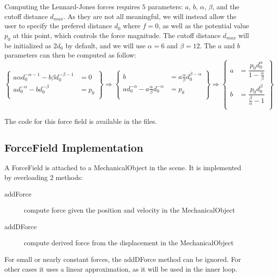 Computing the Lennard-Jones forces requires $5$ parameters: $a$, $b$, $\alpha$, $\beta$, and the cutoff distance $d_{max}$. As they are not all meaningful, we will instead allow the user to specify the prefered distance $d_0$ where $f = 0$, as well as the potential value $p_0$ at this point, which controls the force magnitude. The cutoff distance $d_{max}$ will be initialized as $2 d_0$ by default, and we will use $\alpha=6$ and $\beta=12$. The $a$ and $b$ parameters can then be computed as follow:\\
$$
\left\{\begin{array}{rl}
a \alpha d_0^{-\alpha-1} - b \beta d_0^{-\beta-1} &= 0 \\
a d_0^{-\alpha} - b d_0^{-\beta} &= p_0 \\
\end{array}\right\}
\Longrightarrow
\left\{\begin{array}{rl}
b &= a \frac{\alpha}{\beta} d_0^{\beta-\alpha} \\
a d_0^{-\alpha} - a \frac{\alpha}{\beta} d_0^{-\alpha} &= p_0 \\
\end{array}\right\}
\Longrightarrow
\left\{\begin{array}{rl}
a &= \dfrac{p_0 d_0^\alpha}{1 - \frac{\alpha}{\beta}} \\
b &= \dfrac{p_0 d_0^\beta}{\frac{\beta}{\alpha} - 1} \\
\end{array}\right\}
$$

The code for this force field is available in the
 files.

\subsection{ForceField Implementation}

A ForceField is attached to a MechanicalObject in the scene. It is implemented by overloading 2 methods:

\begin{description}
\item[addForce] compute force given the position and velocity in the MechanicalObject
\item[addDForce] compute derived force from the displacement in the MechanicalObject
\end{description}

For small or nearly constant forces, the addDForce method can be ignored. For other cases it uses a linear approximation, as it will be used in the inner loop.

